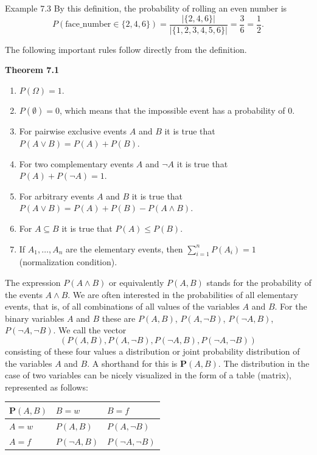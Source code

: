 \documentclass[10pt]{book}
\begin{document}
Example 7.3 By this definition, the probability of rolling an even number is
$$
P(\text{face\_number} \in \{2,4,6\})=\frac{|\{2,4,6\}|}{|\{1,2,3,4,5,6\}|}=\frac{3}{6}=\frac{1}{2} .
$$

The following important rules follow directly from the definition.

\textbf{Theorem 7.1}
\begin{enumerate}
  \item $P(\Omega)=1$.
  \item $P(\emptyset)=0$, which means that the impossible event has a probability of 0.
  \item For pairwise exclusive events $A$ and $B$ it is true that $P(A \vee B)=P(A)+P(B)$.
  \item For two complementary events $A$ and $\neg A$ it is true that $P(A)+P(\neg A)=1$.
  \item For arbitrary events $A$ and $B$ it is true that $P(A \vee B)=P(A)+P(B)-P(A \wedge B)$.
  \item For $A \subseteq B$ it is true that $P(A) \leq P(B)$.
  \item If $A_{1}, \ldots, A_{n}$ are the elementary events, then $\sum_{i=1}^{n} P\left(A_{i}\right)=1$ (normalization condition).
\end{enumerate}

The expression $P(A \wedge B)$ or equivalently $P(A, B)$ stands for the probability of the events $A \wedge B$. We are often interested in the probabilities of all elementary events, that is, of all combinations of all values of the variables $A$ and $B$. For the binary variables $A$ and $B$ these are $P(A, B)$, $P(A, \neg B)$, $P(\neg A, B)$, $P(\neg A, \neg B)$. We call the vector
$$
(P(A, B), P(A, \neg B), P(\neg A, B), P(\neg A, \neg B))
$$
consisting of these four values a distribution or joint probability distribution of the variables $A$ and $B$. A shorthand for this is $\boldsymbol{P}(A, B)$. The distribution in the case of two variables can be nicely visualized in the form of a table (matrix), represented as follows:

\begin{center}
\begin{tabular}{lll}
\hline
$\boldsymbol{P}(A, B)$ & $B=w$ & $B=f$ \\
\hline
$A=w$ & $P(A, B)$ & $P(A, \neg B)$ \\
\hline
$A=f$ & $P(\neg A, B)$ & $P(\neg A, \neg B)$ \\
\hline
\end{tabular}
\end{center}
\end{document}
